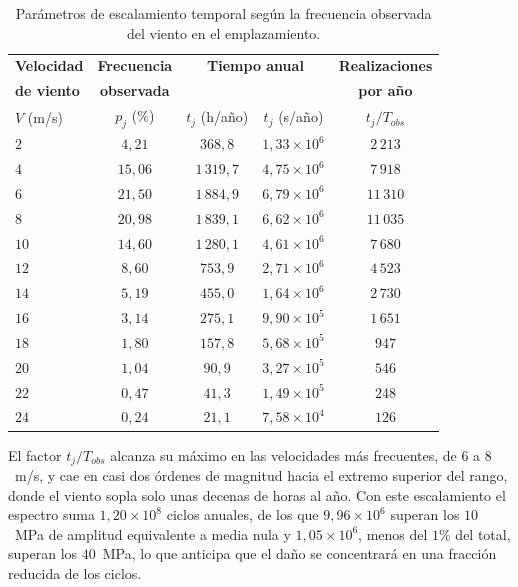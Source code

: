 \begin{table}[H]
    \centering
    \caption{Parámetros de escalamiento temporal según la frecuencia observada del viento en el emplazamiento.}
    \label{tab:weibull_fatiga}
    \begin{tabular}{lcccc}
        \hline
        \textbf{Velocidad} & \textbf{Frecuencia} & \multicolumn{2}{c}{\textbf{Tiempo anual}} & \textbf{Realizaciones} \\
        \textbf{de viento} & \textbf{observada} & \multicolumn{2}{c}{} & \textbf{por año} \\
        $V$ (m/s) & $p_j$ (\%) & $t_j$ (h/año) & $t_j$ (s/año) & $t_j/T_{obs}$ \\
        \hline
        $2$  & $4{,}21$  & $368{,}8$    & $1{,}33 \times 10^6$ & $2\,213$ \\
        $4$  & $15{,}06$ & $1\,319{,}7$ & $4{,}75 \times 10^6$ & $7\,918$ \\
        $6$  & $21{,}50$ & $1\,884{,}9$ & $6{,}79 \times 10^6$ & $11\,310$ \\
        $8$  & $20{,}98$ & $1\,839{,}1$ & $6{,}62 \times 10^6$ & $11\,035$ \\
        $10$ & $14{,}60$ & $1\,280{,}1$ & $4{,}61 \times 10^6$ & $7\,680$ \\
        $12$ & $8{,}60$  & $753{,}9$    & $2{,}71 \times 10^6$ & $4\,523$ \\
        $14$ & $5{,}19$  & $455{,}0$    & $1{,}64 \times 10^6$ & $2\,730$ \\
        $16$ & $3{,}14$  & $275{,}1$    & $9{,}90 \times 10^5$ & $1\,651$ \\
        $18$ & $1{,}80$  & $157{,}8$    & $5{,}68 \times 10^5$ & $947$ \\
        $20$ & $1{,}04$  & $90{,}9$     & $3{,}27 \times 10^5$ & $546$ \\
        $22$ & $0{,}47$  & $41{,}3$     & $1{,}49 \times 10^5$ & $248$ \\
        $24$ & $0{,}24$  & $21{,}1$     & $7{,}58 \times 10^4$ & $126$ \\
        \hline
    \end{tabular}
\end{table}

El factor $t_j/T_{obs}$ alcanza su máximo en las velocidades más frecuentes, de $6$ a $8$~m/s, y cae en casi dos órdenes de magnitud hacia el extremo superior del rango, donde el viento sopla solo unas decenas de horas al año. Con este escalamiento el espectro suma $1{,}20 \times 10^{8}$ ciclos anuales, de los que $9{,}96 \times 10^{6}$ superan los $10$~MPa de amplitud equivalente a media nula y $1{,}05 \times 10^{6}$, menos del $1\%$ del total, superan los $40$~MPa, lo que anticipa que el daño se concentrará en una fracción reducida de los ciclos.

